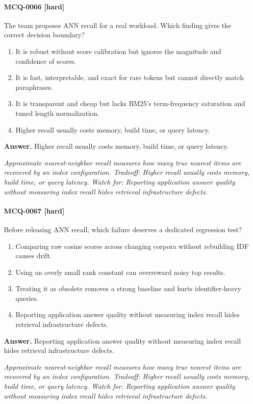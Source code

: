 \paragraph{MCQ-0066 [hard]} The team proposes ANN recall for a real workload. Which finding gives the correct decision boundary?
\begin{enumerate}[label=\Alph*.]
\item It is robust without score calibration but ignores the magnitude and confidence of scores.
\item It is fast, interpretable, and exact for rare tokens but cannot directly match paraphrases.
\item It is transparent and cheap but lacks BM25's term-frequency saturation and tuned length normalization.
\item Higher recall usually costs memory, build time, or query latency.
\end{enumerate}
\noindent\textbf{Answer.} Higher recall usually costs memory, build time, or query latency.
\par\textit{Approximate nearest-neighbor recall measures how many true nearest items are recovered by an index configuration. Tradeoff: Higher recall usually costs memory, build time, or query latency. Watch for: Reporting application answer quality without measuring index recall hides retrieval infrastructure defects.}
\paragraph{MCQ-0067 [hard]} Before releasing ANN recall, which failure deserves a dedicated regression test?
\begin{enumerate}[label=\Alph*.]
\item Comparing raw cosine scores across changing corpora without rebuilding IDF causes drift.
\item Using an overly small rank constant can overreward noisy top results.
\item Treating it as obsolete removes a strong baseline and hurts identifier-heavy queries.
\item Reporting application answer quality without measuring index recall hides retrieval infrastructure defects.
\end{enumerate}
\noindent\textbf{Answer.} Reporting application answer quality without measuring index recall hides retrieval infrastructure defects.
\par\textit{Approximate nearest-neighbor recall measures how many true nearest items are recovered by an index configuration. Tradeoff: Higher recall usually costs memory, build time, or query latency. Watch for: Reporting application answer quality without measuring index recall hides retrieval infrastructure defects.}
